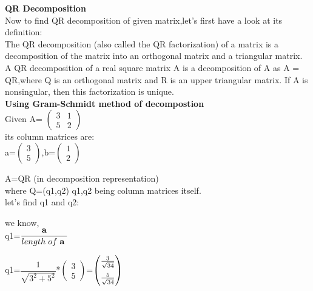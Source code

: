 \documentclass[a4paper,12pt]{article}
\begin{document}
\textbf{QR Decomposition}\\

Now to find QR decomposition of given matrix,let's first have a look at its definition:\\
The QR decomposition (also called the QR factorization) of a matrix is a decomposition of the matrix into an orthogonal matrix and a triangular matrix. A QR decomposition of a real square matrix A is a decomposition of A as
A = QR,where Q is an orthogonal matrix and R is an upper triangular matrix. If
A is nonsingular, then this factorization is unique.\\

\textbf{Using Gram-Schmidt method of decompostion}\\


Given  A= $\begin{pmatrix} 3 & 1  \\ 5 & 2 \end{pmatrix}$\\

its column matrices are:\\
 
a=$\begin{pmatrix} 3 \\ 5 \end{pmatrix}$,b=$\begin{pmatrix} 1 \\ 2 \end{pmatrix}$

\vspace{0.5cm}
 
 A=QR      \hspace{4cm}(in decomposition representation)\\

where Q=(q1,q2)
 q1,q2 being column matrices itself.\\
 
let's find q1 and q2:

we know,\\


q1=$\dfrac{\textbf{a}}{length \hspace{1mm}  of \hspace{1mm} \textbf{a} \hspace{1mm} }$\\
\vspace{1cm}

q1=$\dfrac{1}{\sqrt{3^2+5^2}}$*$\begin{pmatrix} 3 \\ 5 \end{pmatrix}$=$\begin{pmatrix} \frac{3}{\sqrt{34}} \vspace*{2mm} \\ \frac{5}{\sqrt{34}} \end{pmatrix}$
\\
\vspace{1cm}
\end{document}
